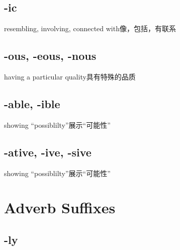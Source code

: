 \subsection{-ic}

\begin{nlist}{resembling, involving, connected with}{像，包括，有联系}
\end{nlist}

\subsection{-ous, -eous, -nous}

\begin{nlist}{having a particular quality}{具有特殊的品质}
\end{nlist}

\subsection{-able, -ible}

\begin{nlist}{showing ``possiblilty''}{展示“可能性”}
\end{nlist}

\subsection{-ative, -ive, -sive}

\begin{nlist}{showing ``possiblilty''}{展示“可能性”}
\end{nlist}

\section{Adverb Suffixes}

\subsection{-ly}

